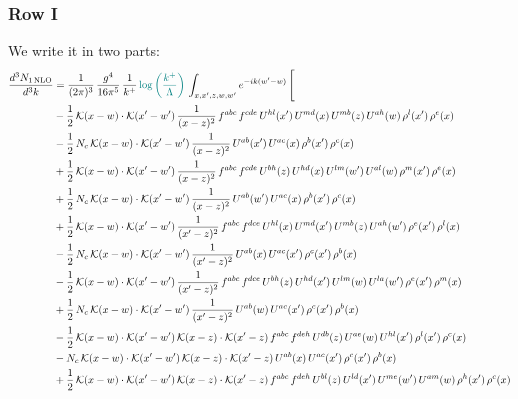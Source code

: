 \documentclass[9pt]{article}
\numberwithin{equation}{section}
\begin{document}
\subsubsection{Row I}
We write it in two parts: 
\begin{align}
\frac{d^{3}N_{1\,\mathrm{NLO}}}{d^{3}k} & = \frac{1}{(2\pi)^{3}}\,\frac{g^{4}}{16\pi^{5}}\,\frac{1}{k^{+}}\,{\color{teal}\log{\left(\frac{k^{+}}{\Lambda}\right)}}\,\int_{x,x',z,w,w'}e^{-ik(w'-w)}\,\Bigg[\notag\\ & -\frac{1}{2}\,\mathcal{K}(x-w)\cdot\mathcal{K}(x'-w')\,\frac{1}{(x-z)^{2}}\,f^{abc}\,f^{cde}\,U^{hl}(x')\,U^{md}(x)\,U^{mb}(z)\,U^{ah}(w)\,\rho^{l}(x')\,\rho^{e}(x)\notag\\
& -\frac{1}{2}\,N_{c}\,\mathcal{K}(x-w)\cdot\mathcal{K}(x'-w')\,\frac{1}{(x-z)^{2}}\,U^{ab}(x')\,U^{ac}(x)\,\rho^{b}(x')\,\rho^{c}(x)\notag\\
& +\frac{1}{2}\,\mathcal{K}(x-w)\cdot\mathcal{K}(x'-w')\,\frac{1}{(x-z)^{2}}\,f^{abc}\,f^{cde}\,U^{bh}(z)\,U^{hd}(x)\,U^{lm}(w')\,U^{al}(w)\,\rho^{m}(x')\,\rho^{e}(x)\notag\\
& +\frac{1}{2}\,N_{c}\,\mathcal{K}(x-w)\cdot\mathcal{K}(x'-w')\,\frac{1}{(x-z)^{2}}\,U^{ab}(w')\,U^{ac}(x)\,\rho^{b}(x')\,\rho^{c}(x)\notag\\
& +\frac{1}{2}\,\mathcal{K}(x-w)\cdot\mathcal{K}(x'-w')\,\frac{1}{(x'-z)^{2}}\,f^{abc}\,f^{dce}\,U^{hl}(x)\,U^{md}(x')\,U^{mb}(z)\,U^{ah}(w')\,\rho^{e}(x')\,\rho^{l}(x)\notag\\
& -\frac{1}{2}\,N_{c}\,\mathcal{K}(x-w)\cdot\mathcal{K}(x'-w')\,\frac{1}{(x'-z)^{2}}\,U^{ab}(x)\,U^{ac}(x')\,\rho^{c}(x')\,\rho^{b}(x)\notag\\
& -\frac{1}{2}\,\mathcal{K}(x-w)\cdot\mathcal{K}(x'-w')\,\frac{1}{(x'-z)^{2}}\,f^{abc}\,f^{dce}\,U^{bh}(z)\,U^{hd}(x')\,U^{lm}(w)\,U^{la}(w')\,\rho^{e}(x')\,\rho^{m}(x)\notag\\
& +\frac{1}{2}\,N_{c}\,\mathcal{K}(x-w)\cdot\mathcal{K}(x'-w')\,\frac{1}{(x'-z)^{2}}\,U^{ab}(w)\,U^{ac}(x')\,\rho^{c}(x')\,\rho^{b}(x)\notag\\
& -\frac{1}{2}\,\mathcal{K}(x-w)\cdot\mathcal{K}(x'-w')\,\mathcal{K}(x-z)\cdot\mathcal{K}(x'-z)\,f^{abc}\,f^{deh}\,U^{db}(z)\,U^{ae}(w)\,U^{hl}(x')\,\rho^{l}(x')\,\rho^{c}(x)\notag\\
& -N_{c}\,\mathcal{K}(x-w)\cdot\mathcal{K}(x'-w')\,\mathcal{K}(x-z)\cdot\mathcal{K}(x'-z)\,U^{ab}(x)\,U^{ac}(x')\,\rho^{c}(x')\,\rho^{b}(x)\notag\\
& +\frac{1}{2}\,\mathcal{K}(x-w)\cdot\mathcal{K}(x'-w')\,\mathcal{K}(x-z)\cdot\mathcal{K}(x'-z)\,f^{abc}\,f^{deh}\,U^{bl}(z)\,U^{ld}(x')\,U^{me}(w')\,U^{am}(w)\,\rho^{h}(x')\,\rho^{c}(x)\notag\\

\end{align}
\end{document}
